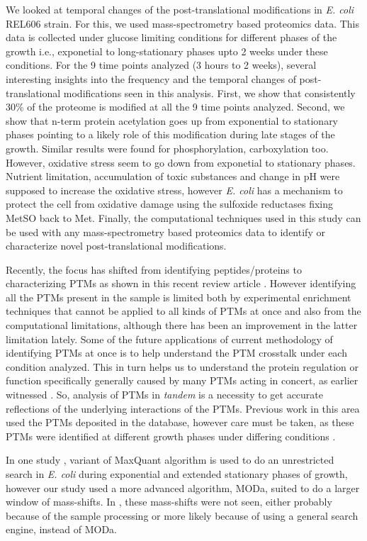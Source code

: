 \documentclass[12pt]{article}
\begin{document}
We looked at temporal changes of the post-translational modifications in \emph{E. coli} REL606 strain. For this, we used mass-spectrometry based proteomics data. This data is collected under glucose limiting conditions for different phases of the growth i.e., exponetial to long-stationary phases upto 2 weeks under these conditions. For the 9 time points analyzed (3 hours to 2 weeks), several interesting insights into the frequency and the temporal changes of post-translational modifications seen in this analysis. First, we show that consistently 30\% of the proteome is modified at all the 9 time points analyzed. Second, we show that n-term protein acetylation goes up from exponential to stationary phases pointing to a likely role of this modification during late stages of the growth. Similar results were found for phosphorylation, carboxylation too. However, oxidative stress seem to go down from exponetial to stationary phases. Nutrient limitation, accumulation of toxic substances and change in pH were supposed to increase the oxidative stress, however \emph{E. coli} has a mechanism to protect the cell from oxidative damage using the sulfoxide reductases fixing MetSO back to Met. Finally, the computational techniques used in this study can be used with any mass-spectrometry based proteomics data to identify or characterize novel post-translational modifications.

Recently, the focus has shifted from identifying peptides/proteins to characterizing PTMs as shown in this recent review article \cite{OlsenMann2013}. However identifying all the PTMs present in the sample is limited both by experimental enrichment techniques that cannot be applied to all kinds of PTMs at once and also from the computational limitations, although there has been an improvement in the latter limitation lately. Some of the future applications of current methodology of identifying PTMs at once is to help understand the PTM crosstalk under each condition analyzed. This in turn helps us to understand the protein regulation or function specifically generally caused by many PTMs acting in concert, as earlier witnessed \cite{Pengetal2014}. So, analysis of PTMs in \emph{tandem} is a necessity to get accurate reflections of the underlying interactions of the PTMs. Previous work in this area used the PTMs deposited in the database, however care must be taken, as these PTMs were identified at different growth phases under differing conditions \cite{Pengetal2014}.

In one study \cite{Soufietal2015}, variant of MaxQuant algorithm is used to do an unrestricted search in \emph{E. coli} during exponential and extended stationary phases of growth, however our study used a more advanced algorithm, MODa, suited to do a larger window of mass-shifts. In \cite{Soufietal2015}, these mass-shifts were not seen, either probably because of the sample processing or more likely because of using a general search engine, instead of MODa. 
\end{document}
